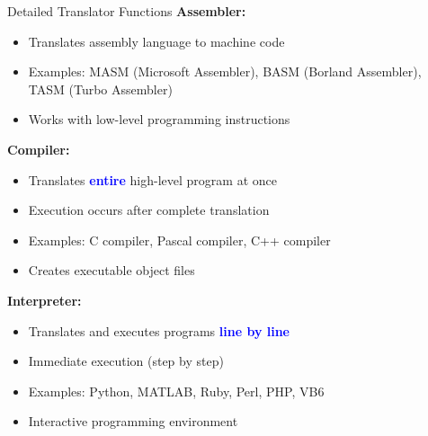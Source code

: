 \documentclass[aspectratio=169]{beamer}
\begin{document}
\begin{frame}{Detailed Translator Functions}
    \textbf{Assembler:}
    \begin{itemize}
        \item Translates assembly language to machine code
        \item Examples: MASM (Microsoft Assembler), BASM (Borland Assembler), TASM (Turbo Assembler)
        \item Works with low-level programming instructions
    \end{itemize}
    
    \textbf{Compiler:}
    \begin{itemize}
        \item Translates \textcolor{blue}{\textbf{entire}}  high-level program at once
        \item Execution occurs after complete translation
        \item Examples: C compiler, Pascal compiler, C++ compiler
        \item Creates executable object files
    \end{itemize}
    
    \textbf{Interpreter:}
    \begin{itemize}
        \item Translates and executes programs \textcolor{blue}{\textbf{line by line}}
        \item Immediate execution (step by step)
        \item Examples: Python, MATLAB, Ruby, Perl, PHP, VB6
        \item Interactive programming environment
    \end{itemize}
\end{frame}
\end{document}
